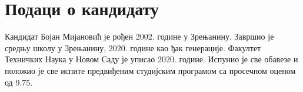 \documentclass[12pt, a4paper]{article}
\begin{document}
\pagebreak
\section{Подаци о кандидату}
Кандидат Бојан Мијановић је рођен 2002. године у Зрењанину. Завршио је средњу школу у Зрењанину, 2020. године као ђак генерације. Факултет Техничких Наука у Новом Саду је уписао 2020. године. Испунио је све обавезе и положио је све испите предвиђеним студијским програмом са просечном оценом од 9.75.
\end{document}
